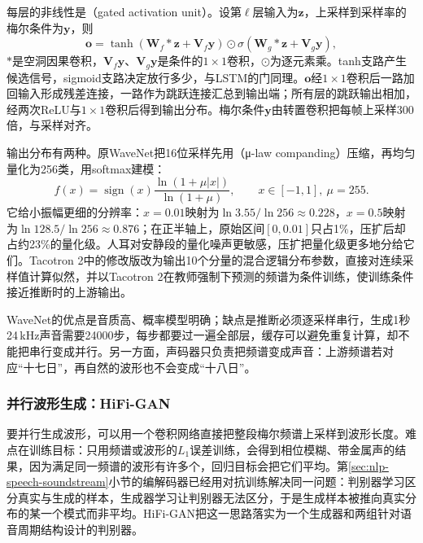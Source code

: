 每层的非线性是（gated activation unit）。设第$\ell$层输入为$\bm{z}$，上采样到采样率的梅尔条件为$\bm{y}$，则
\begin{equation}
  \bm{o}=\tanh(\bm{W}_{f}*\bm{z}+\bm{V}_{f}\bm{y})\odot\sigma(\bm{W}_{g}*\bm{z}+\bm{V}_{g}\bm{y}),
  \label{eq:nlp-speech-wavenet-gate}
\end{equation}
$*$是空洞因果卷积，$\bm{V}_f\bm{y}$、$\bm{V}_g\bm{y}$是条件的$1\times1$卷积，$\odot$为逐元素乘。tanh支路产生候选信号，sigmoid支路决定放行多少，与LSTM的门同理。$\bm{o}$经$1\times1$卷积后一路加回输入形成残差连接，一路作为跳跃连接汇总到输出端；所有层的跳跃输出相加，经两次ReLU与$1\times1$卷积后得到输出分布。梅尔条件$\bm{y}$由转置卷积把每帧上采样300倍，与采样对齐。

输出分布有两种。原WaveNet把16位采样先用（μ-law companding）压缩，再均匀量化为256类，用softmax建模：
\begin{equation}
  f(x)=\operatorname{sign}(x)\frac{\ln(1+\mu\lvert x\rvert)}{\ln(1+\mu)},\qquad
  x\in[-1,1],\ \mu=255 .
  \label{eq:nlp-speech-mulaw}
\end{equation}
它给小振幅更细的分辨率：$x=0.01$映射为$\ln3.55/\ln256\approx0.228$，$x=0.5$映射为$\ln128.5/\ln256\approx0.876$；在正半轴上，原始区间$[0,0.01]$只占1\%，压扩后却占约23\%的量化级。人耳对安静段的量化噪声更敏感，压扩把量化级更多地分给它们。Tacotron 2中的修改版改为输出10个分量的混合逻辑分布参数，直接对连续采样值计算似然，并以Tacotron 2在教师强制下预测的频谱为条件训练，使训练条件接近推断时的上游输出。

WaveNet的优点是音质高、概率模型明确；缺点是推断必须逐采样串行，生成1秒24\,kHz声音需要24000步，每步都要过一遍全部层，缓存可以避免重复计算，却不能把串行变成并行。另一方面，声码器只负责把频谱变成声音：上游频谱若对应“十七日”，再自然的波形也不会变成“十八日”。

\subsubsection{并行波形生成：HiFi-GAN}
\label{sec:nlp-speech-hifigan}

要并行生成波形，可以用一个卷积网络直接把整段梅尔频谱上采样到波形长度。难点在训练目标：只用频谱或波形的$L_1$误差训练，会得到相位模糊、带金属声的结果，因为满足同一频谱的波形有许多个，回归目标会把它们平均。第\ref{sec:nlp-speech-soundstream}小节的编解码器已经用对抗训练解决同一问题：判别器学习区分真实与生成的样本，生成器学习让判别器无法区分，于是生成样本被推向真实分布的某一个模式而非平均。HiFi-GAN把这一思路落实为一个生成器和两组针对语音周期结构设计的判别器。


